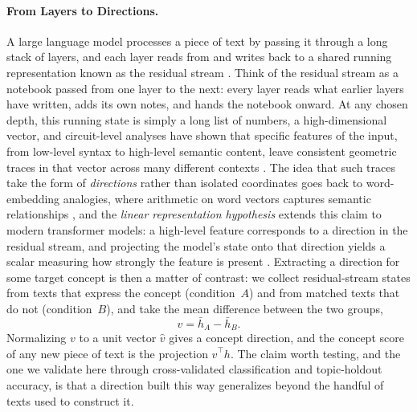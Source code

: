 \documentclass[twocolumn]{article}
\begin{document}
\paragraph{From Layers to Directions.}
A large language model processes a piece of text by passing it through a
long stack of layers, and each layer reads from and writes back to a shared
running representation known as the residual stream
\citep{vaswani2017attention, elhage2021framework}.
Think of the residual stream as a notebook passed from one layer to the
next: every layer reads what earlier layers have written, adds its own
notes, and hands the notebook onward.
At any chosen depth, this running state is simply a long list of numbers, a
high-dimensional vector, and circuit-level analyses have shown that specific
features of the input, from low-level syntax to high-level semantic content,
leave consistent geometric traces in that vector across many different
contexts \citep{olah2020zoom}.
The idea that such traces take the form of \emph{directions} rather than
isolated coordinates goes back to word-embedding analogies, where arithmetic
on word vectors captures semantic relationships \citep{mikolov2013word2vec},
and the \textit{linear representation hypothesis} extends this claim to
modern transformer models: a high-level feature corresponds to a direction
in the residual stream, and projecting the model's state onto that direction
yields a scalar measuring how strongly the feature is present
\citep{park2024linear}.
Extracting a direction for some target concept is then a matter of
contrast: we collect residual-stream states from texts that express the
concept (condition~$A$) and from matched texts that do not (condition~$B$),
and take the mean difference between the two groups,
\begin{equation}
  v = \bar{h}_{A} - \bar{h}_{B}.
  \label{eq:mean_diff}
\end{equation}
Normalizing $v$ to a unit vector $\hat{v}$ gives a concept direction, and the
concept score of any new piece of text is the projection $\hat{v}^{\!\top}
h$.
The claim worth testing, and the one we validate here through cross-validated
classification and topic-holdout accuracy, is that a direction built this way
generalizes beyond the handful of texts used to construct it.
\end{document}
